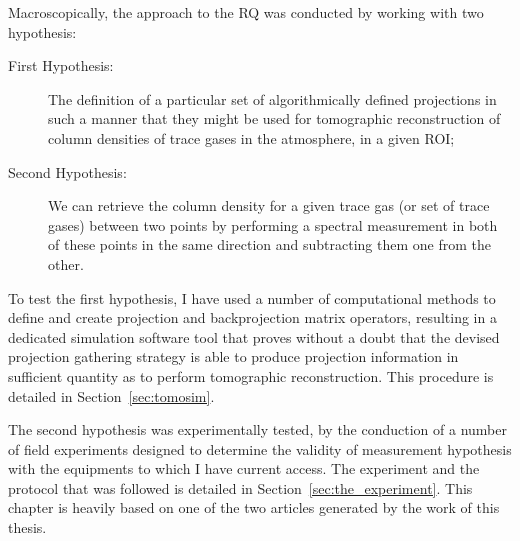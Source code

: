 

Macroscopically, the approach to the \gls{RQ} was conducted by working
with two hypothesis:
\begin{description}
    \item[First Hypothesis:] The definition of a particular set of
        algorithmically defined projections in such a manner that they
        might be used for tomographic reconstruction of column densities
        of trace gases in the atmosphere, in a given \gls{ROI};
    \item[Second Hypothesis:] We can retrieve the column density for a
        given trace gas (or set of trace gases) between two points by
        performing a spectral measurement in both of these points in the
        same direction and subtracting them one from the other.
\end{description}

To test the first hypothesis, I have used a number of computational
methods to define and create projection and backprojection matrix
operators, resulting in a dedicated simulation software tool that proves
without a doubt that the devised projection gathering strategy is able
to produce projection information in sufficient quantity as to perform
tomographic reconstruction. This procedure is detailed in
Section~\ref{sec:tomosim}. 

The second hypothesis was experimentally tested, by the conduction of a
number of field experiments designed to determine the validity of
measurement hypothesis with the equipments to which I have current
access. The experiment and the protocol that was followed is detailed in
Section~\ref{sec:the_experiment}. This chapter is heavily based on one
of the two articles generated by the work of this thesis.

